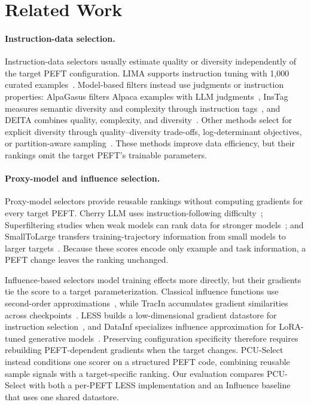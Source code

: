 \section{Related Work}

\paragraph{Instruction-data selection.}
Instruction-data selectors usually estimate quality or diversity independently of the target PEFT configuration. LIMA supports instruction tuning with 1,000 curated examples~\cite{zhou2023lima}. Model-based filters instead use judgments or instruction properties: AlpaGasus filters Alpaca examples with LLM judgments~\cite{chen2024alpagasus}, InsTag measures semantic diversity and complexity through instruction tags~\cite{lu2023instag}, and DEITA combines quality, complexity, and diversity~\cite{liu2024deita}. Other methods select for explicit diversity through quality--diversity trade-offs, log-determinant objectives, or partition-aware sampling~\cite{bukharin2023diversity, wang2024diversity, rao2024commonit}. These methods improve data efficiency, but their rankings omit the target PEFT's trainable parameters.

\paragraph{Proxy-model and influence selection.}
Proxy-model selectors provide reusable rankings without computing gradients for every target PEFT. Cherry LLM uses instruction-following difficulty~\cite{li2023cherry}; Superfiltering studies when weak models can rank data for stronger models~\cite{wang2024superfiltering}; and SmallToLarge transfers training-trajectory information from small models to larger targets~\cite{yang2024smalltolarge}. Because these scores encode only example and task information, a PEFT change leaves the ranking unchanged.

Influence-based selectors model training effects more directly, but their gradients tie the score to a target parameterization. Classical influence functions use second-order approximations~\cite{koh2017understanding}, while TracIn accumulates gradient similarities across checkpoints~\cite{pruthi2020tracin}. LESS builds a low-dimensional gradient datastore for instruction selection~\cite{xia2024less}, and DataInf specializes influence approximation for LoRA-tuned generative models~\cite{kwon2023datainf}. Preserving configuration specificity therefore requires rebuilding PEFT-dependent gradients when the target changes. PCU-Select instead conditions one scorer on a structured PEFT code, combining reusable sample signals with a target-specific ranking. Our evaluation compares PCU-Select with both a per-PEFT LESS implementation and an Influence baseline that uses one shared datastore.

